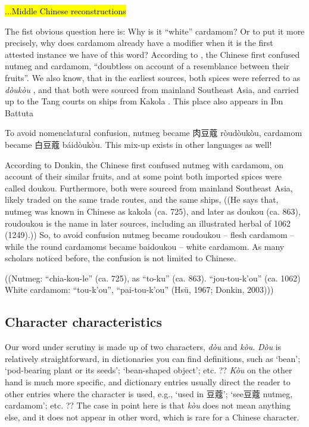 \documentclass[12pt]{article}
\newcommand{\tc}[1]{\traditionalchinesefont{#1}\rmfamily}
\begin{document}
\hl{...Middle Chinese reconstructions}

The fist obvious question here is: Why is it ``white'' cardamom? Or to put it more precisely, why does cardamom already have a modifier when it is the first attested instance we have of this word? According to \textcite[22]{donkin_2003_east}, the Chinese first confused nutmeg and cardamom, ``doubtless on account of a resemblance between their fruits''. We also know, that in the earliest sources, both spices were referred to as \textit{dòukòu} \parencites{hsu_1967_notes}{donkin_2003_east}, and that both were sourced from mainland Southeast Asia, and carried up to the Tang courts on ships from Kakola \parencite[184-185]{schafer_1985_golden}. This place also appears in Ibn Battuta \parencite{dunn_1986_adventures}


To avoid nomenclatural confusion, nutmeg became 肉豆蔻 ròudòukòu, cardamom became 白豆蔻 báidòukòu.
This mix-up exists in other languages as well!

According to Donkin, the Chinese first confused nutmeg with cardamom, on account of their similar fruits, and at some point both imported spices were called doukou.
Furthermore, both were sourced from mainland Southeast Asia, likely traded on the same trade routes, and the same ships, ((He says that, nutmeg was known in Chinese as kakola (ca. 725), and later as doukou (ca. 863), roudoukou is the name in later sources, including an illustrated herbal of 1062 (1249).))
So, to avoid confusion nutmeg became roudoukou – flesh cardamom – while the round cardamoms became baidoukou – white cardamom.
As many scholars noticed before, the confusion is not limited to Chinese.

((Nutmeg: “chia-kou-le” (ca. 725), as “to-ku” (ca. 863). “jou-tou-k’ou” (ca. 1062)
White cardamom: “tou-k’ou”, “pai-tou-k’ou” (Hsü, 1967; Donkin, 2003)))



\subsection{Character characteristics}

Our word under scrutiny is made up of two characters, \tc{豆} \textit{dòu} and \tc{蔻} \textit{kòu}. \textit{Dòu} is relatively straightforward, in dictionaries you can find definitions, such as `bean'; `pod-bearing plant or its seeds'; `bean-shaped object'; etc. ?? \textit{Kòu} on the other hand is much more specific, and dictionary entries usually direct the reader to other entries where the character is used, e.g., `used in 豆蔻'; `see豆蔻 nutmeg, cardamom'; etc. ?? The case in point here is that \textit{kòu} does not mean anything else, and it does not appear in other word, which is rare for a Chinese character. 
\end{document}
